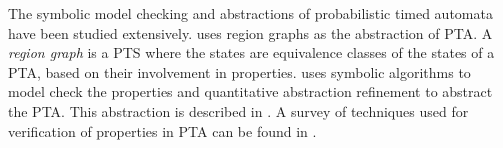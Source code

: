 The symbolic model checking and abstractions of probabilistic timed automata have been studied extensively. \cite{Sproston2001} uses region graphs as the abstraction of PTA. A \emph{region graph} is a PTS where the states are equivalence classes of the states of a PTA, based on their involvement in properties. \cite{Kwiatkowska2007} uses symbolic algorithms to model check the properties and quantitative abstraction refinement to abstract the PTA. This abstraction is described in \cite{Kattenbelt2010}. A survey of techniques used for verification of properties in PTA can be found in \cite{Norman2013}.

%
%
%
%
%
%
%
%
